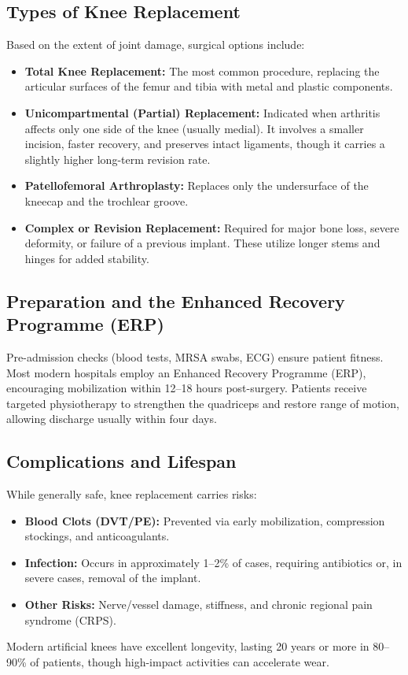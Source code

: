 \documentclass[12pt,a4paper]{article}
\begin{document}
\subsection{Types of Knee Replacement}
Based on the extent of joint damage, surgical options include:
\begin{itemize}
    \item \textbf{Total Knee Replacement:} The most common procedure, replacing the articular surfaces of the femur and tibia with metal and plastic components.
    \item \textbf{Unicompartmental (Partial) Replacement:} Indicated when arthritis affects only one side of the knee (usually medial). It involves a smaller incision, faster recovery, and preserves intact ligaments, though it carries a slightly higher long-term revision rate.
    \item \textbf{Patellofemoral Arthroplasty:} Replaces only the undersurface of the kneecap and the trochlear groove.
    \item \textbf{Complex or Revision Replacement:} Required for major bone loss, severe deformity, or failure of a previous implant. These utilize longer stems and hinges for added stability.
\end{itemize}

\subsection{Preparation and the Enhanced Recovery Programme (ERP)}
Pre-admission checks (blood tests, MRSA swabs, ECG) ensure patient fitness. Most modern hospitals employ an Enhanced Recovery Programme (ERP), encouraging mobilization within 12--18 hours post-surgery. Patients receive targeted physiotherapy to strengthen the quadriceps and restore range of motion, allowing discharge usually within four days.

\subsection{Complications and Lifespan}
While generally safe, knee replacement carries risks:
\begin{itemize}
    \item \textbf{Blood Clots (DVT/PE):} Prevented via early mobilization, compression stockings, and anticoagulants.
    \item \textbf{Infection:} Occurs in approximately 1--2\% of cases, requiring antibiotics or, in severe cases, removal of the implant.
    \item \textbf{Other Risks:} Nerve/vessel damage, stiffness, and chronic regional pain syndrome (CRPS).
\end{itemize}
Modern artificial knees have excellent longevity, lasting 20 years or more in 80--90\% of patients, though high-impact activities can accelerate wear.
\end{document}

